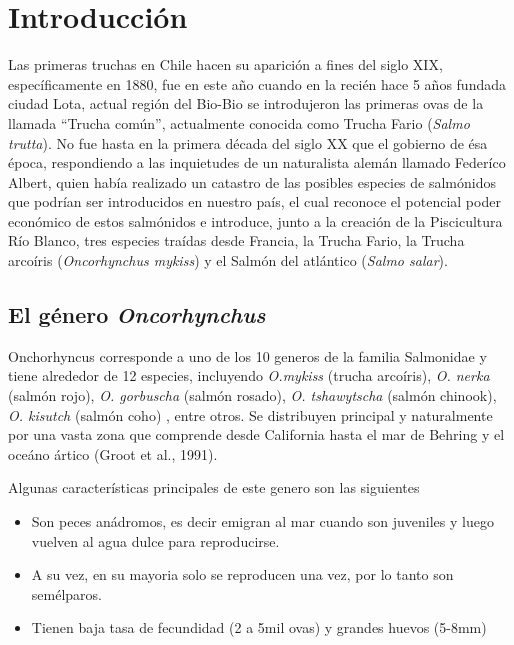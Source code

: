 \documentclass[11pt,a4paper,]{article}
\begin{document}
\section{Introducción}\label{introducciuxf3n}

Las primeras truchas en Chile hacen su aparición a fines del siglo XIX,
específicamente en 1880, fue en este año cuando en la recién hace 5 años
fundada ciudad Lota, actual región del Bio-Bio se introdujeron las
primeras ovas de la llamada ``Trucha común'', actualmente conocida como
Trucha Fario (\emph{Salmo trutta}). No fue hasta en la primera década
del siglo XX que el gobierno de ésa época, respondiendo a las
inquietudes de un naturalista alemán llamado Federíco Albert, quien
había realizado un catastro de las posibles especies de salmónidos que
podrían ser introducidos en nuestro país, el cual reconoce el potencial
poder económico de estos salmónidos e introduce, junto a la creación de
la Piscicultura Río Blanco, tres especies traídas desde Francia, la
Trucha Fario, la Trucha arcoíris (\emph{Oncorhynchus mykiss}) y el
Salmón del atlántico (\emph{Salmo salar}).

\subsection{El género
\emph{Oncorhynchus}}\label{el-guxe9nero-oncorhynchus}

Onchorhyncus corresponde a uno de los 10 generos de la familia
Salmonidae y tiene alrededor de 12 especies, incluyendo \emph{O.mykiss}
(trucha arcoíris), \emph{O. nerka} (salmón rojo), \emph{O. gorbuscha}
(salmón rosado), \emph{O. tshawytscha} (salmón chinook), \emph{O.
kisutch} (salmón coho) , entre otros. Se distribuyen principal y
naturalmente por una vasta zona que comprende desde California hasta el
mar de Behring y el oceáno ártico (Groot et al., 1991).

Algunas características principales de este genero son las siguientes

\begin{itemize}
\itemsep1pt\parskip0pt
\item
  Son peces anádromos, es decir emigran al mar cuando son juveniles y
  luego vuelven al agua dulce para reproducirse.
\item
  A su vez, en su mayoria solo se reproducen una vez, por lo tanto son
  semélparos.
\item
  Tienen baja tasa de fecundidad (2 a 5mil ovas) y grandes huevos
  (5-8mm)
\end{itemize}
\end{document}
